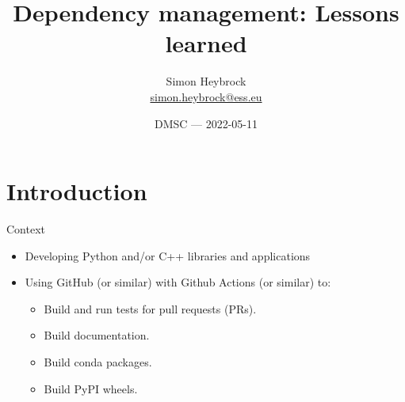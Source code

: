 \documentclass[english,aspectratio=1610,smaller]{beamer}
\begin{document}
\title{Dependency management: Lessons learned}
\author[Simon Heybrock]{Simon Heybrock \\{\footnotesize\url{simon.heybrock@ess.eu}}\\\vspace{2mm}
}

\date{\scriptsize DMSC --- 2022-05-11}


\begin{frame}[plain]
    \titlepage
\end{frame}




\section{Introduction}

\begin{frame}{Context}
  \begin{itemize}
    \item Developing Python and/or C++ libraries and applications
    \item Using GitHub (or similar) with Github Actions (or similar) to:
      \begin{itemize}
        \item Build and run tests for pull requests (PRs).
        \item Build documentation.
        \item Build conda packages.
        \item Build PyPI wheels.
      \end{itemize}
  \end{itemize}
\end{frame}
\end{document}
